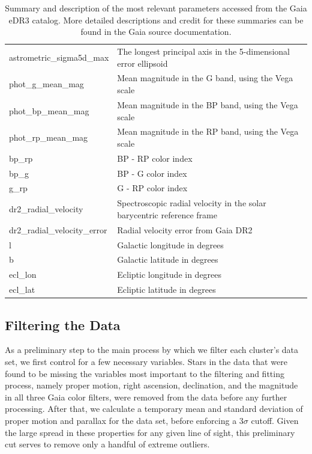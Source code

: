 \documentclass[onecolumn,table,xcdraw,super]{aastex631}
\begin{document}
\begin{table}[]
\begin{tabular}{ll}
astrometric\_sigma5d\_max      & The longest principal axis in the 5-dimensional error ellipsoid           \\
phot\_g\_mean\_mag              & Mean magnitude in the G band, using the Vega scale            \\
phot\_bp\_mean\_mag             & Mean magnitude in the BP band, using the Vega scale            \\
phot\_rp\_mean\_mag             & Mean magnitude in the RP band, using the Vega scale            \\
bp\_rp                        &  BP - RP color index           \\
bp\_g                         &  BP - G color index           \\
g\_rp                         &  G - RP color index           \\
dr2\_radial\_velocity          & Spectroscopic radial velocity in the solar barycentric reference frame            \\
dr2\_radial\_velocity\_error    & Radial velocity error from Gaia DR2            \\
l                            &  Galactic longitude in degrees           \\
b                            &  Galactic latitude in degrees           \\
ecl\_lon                      & Ecliptic longitude in degrees            \\
ecl\_lat                      & Ecliptic latitude in degrees            \\
\bottomrule
\end{tabular}
\caption{Summary and description of the most relevant parameters accessed from the Gaia eDR3 catalog. More detailed descriptions and credit for these summaries can be found in the Gaia source documentation.}
\end{table}

\subsection{Filtering the Data} \label{sec:filtering}
As a preliminary step to the main process by which we filter each cluster's data set, we first control for a few necessary variables. Stars in the data that were found to be missing the variables most important to the filtering and fitting process, namely proper motion, right ascension, declination, and the magnitude in all three Gaia color filters, were removed from the data before any further processing. After that, we calculate a temporary mean and standard deviation of proper motion and parallax for the data set, before enforcing a $3\sigma$ cutoff. Given the large spread in these properties for any given line of sight, this preliminary cut serves to remove only a handful of extreme outliers.
\end{document}
